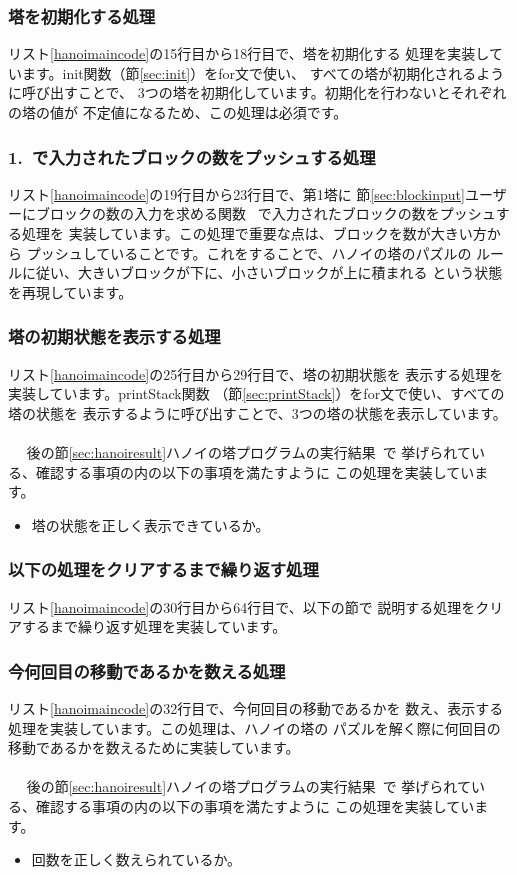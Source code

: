\documentclass[a4j]{jarticle}
\begin{document}
\subsubsection{塔を初期化する処理}
リスト\ref{hanoimaincode}の15行目から18行目で、塔を初期化する
処理を実装しています。init関数（節\ref{sec:init}）をfor文で使い、
すべての塔が初期化されるように呼び出すことで、
3つの塔を初期化しています。初期化を行わないとそれぞれの塔の値が
不定値になるため、この処理は必須です。

\subsubsection{1.~で入力されたブロックの数をプッシュする処理}
リスト\ref{hanoimaincode}の19行目から23行目で、第1塔に
節\ref{sec:blockinput}ユーザーにブロックの数の入力を求める関数~
で入力されたブロックの数をプッシュする処理を
実装しています。この処理で重要な点は、ブロックを数が大きい方から
プッシュしていることです。これをすることで、ハノイの塔のパズルの
ルールに従い、大きいブロックが下に、小さいブロックが上に積まれる
という状態を再現しています。

\subsubsection{塔の初期状態を表示する処理}
\label{sec:printTower}
リスト\ref{hanoimaincode}の25行目から29行目で、塔の初期状態を
表示する処理を実装しています。printStack関数
（節\ref{sec:printStack}）をfor文で使い、すべての塔の状態を
表示するように呼び出すことで、3つの塔の状態を表示しています。
\\\\~~
後の節\ref{sec:hanoiresult}ハノイの塔プログラムの実行結果~で
挙げられている、確認する事項の内の以下の事項を満たすように
この処理を実装しています。
\begin{itemize}
  \item 塔の状態を正しく表示できているか。
\end{itemize}

\subsubsection{以下の処理をクリアするまで繰り返す処理}
リスト\ref{hanoimaincode}の30行目から64行目で、以下の節で
説明する処理をクリアするまで繰り返す処理を実装しています。

\subsubsection{今何回目の移動であるかを数える処理}
リスト\ref{hanoimaincode}の32行目で、今何回目の移動であるかを
数え、表示する処理を実装しています。この処理は、ハノイの塔の
パズルを解く際に何回目の移動であるかを数えるために実装しています。
\\\\~~
後の節\ref{sec:hanoiresult}ハノイの塔プログラムの実行結果~で
挙げられている、確認する事項の内の以下の事項を満たすように
この処理を実装しています。
\begin{itemize}
  \item 回数を正しく数えられているか。
\end{itemize}
\end{document}
